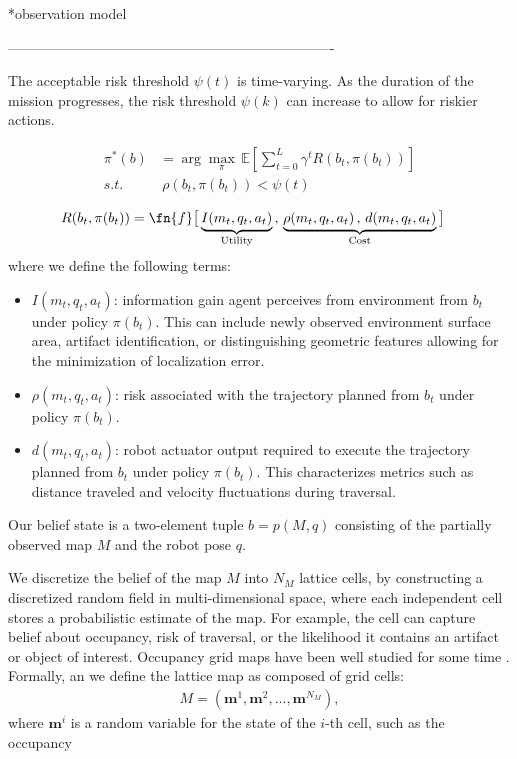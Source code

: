 \documentclass{article}
\begin{document}
*observation model


----------------------------------------------------------------------

The acceptable risk threshold $\psi(t)$ is time-varying. As the duration of the mission progresses, the risk threshold $\psi(k)$ can increase to allow for riskier actions.


\begin{align}
  \pi^*(b) &= \arg\max_\pi \, \mathbb{E} \left[ \sum_{t=0}^{L} \gamma^t R(b_t, \pi(b_t)) \right] \\
  s.t.~&~\rho(b_t,\pi(b_t)) < \psi(t)
\end{align}

\begin{align}
    R(b_t, \pi(b_t)) &= \fn{f}\big[ \underbrace{I(m_t, q_t, a_t)}_{\text{Utility}} \, , \, \underbrace{\rho(m_t, q_t, a_t) \, , \, d(m_t, q_t, a_t)}_{\text{Cost}} \big]
    \label{eq:reward}
\end{align}
where we define the following terms:
\begin{itemize}[labelindent=0pt,labelwidth=1.25em,leftmargin=!]
    \item $I(m_t, q_t, a_t)$: information gain agent perceives from environment from $b_t$ under policy $\pi(b_t)$. This can include newly observed environment surface area, artifact identification, or distinguishing geometric features allowing for the minimization of localization error.
    \item $\rho(m_t, q_t, a_t)$: risk associated with the trajectory planned from $b_t$ under policy $\pi(b_t)$.
    \item $d(m_t, q_t, a_t)$: robot actuator output required to execute the trajectory planned from $b_t$ under policy $\pi(b_t)$. This characterizes metrics such as distance traveled and velocity fluctuations during traversal. 
\end{itemize}

Our belief state is a two-element tuple $b=p(M,q)$ consisting of the partially observed map $M$ and the robot pose $q$.

We discretize the belief of the map $M$ into $N_M$ lattice cells, by constructing a discretized random field in multi-dimensional space, where each independent cell stores a probabilistic estimate of the map.  For example, the cell can capture belief about occupancy, risk of traversal, or the likelihood it contains an artifact or object of interest.  Occupancy grid maps have been well studied for some time \cite{moravec1985high,elfes1990stochastic}.
%
Formally, an we define the lattice map as composed of grid cells:
\begin{align}
  M = (\mathbf{m}^1, \mathbf{m}^2, \dots, \mathbf{m}^{N_M}),
\end{align}
where $\mathbf{m}^i$ is a random variable for the state of the $i$-th cell, such as the occupancy 
\end{document}
